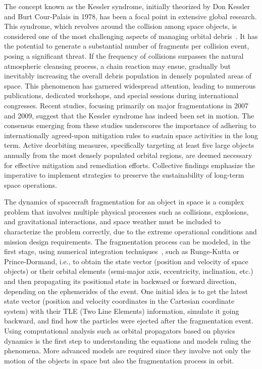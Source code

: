 \documentclass[11pt]{article} %
\begin{document}
The concept known as the Kessler syndrome, initially theorized by Don Kessler and Burt Cour-Palais in 1978, has been a focal point in extensive global research. This syndrome, which revolves around the collision among space objects, is considered one of the most challenging aspects of managing orbital debris~\cite{kessler_collision_1978}. It has the potential to generate a substantial number of fragments per collision event, posing a significant threat. If the frequency of collisions surpasses the natural atmospheric cleansing process, a chain reaction may ensue, gradually but inevitably increasing the overall debris population in densely populated areas of space. This phenomenon has garnered widespread attention, leading to numerous publications, dedicated workshops, and special sessions during international congresses. Recent studies, focusing primarily on major fragmentations in 2007 and 2009, suggest that the Kessler syndrome has indeed been set in motion. The consensus emerging from these studies underscores the importance of adhering to internationally agreed-upon mitigation rules to sustain space activities in the long term. Active deorbiting measures, specifically targeting at least five large objects annually from the most densely populated orbital regions, are deemed necessary for effective mitigation and remediation efforts. Collective findings emphasize the imperative to implement strategies to preserve the sustainability of long-term space operations.~\cite{bonnal_active_2013}

The dynamics of spacecraft fragmentation for an object in space is a complex problem that involves multiple physical processes such as collisions, explosions, and gravitational interactions, and space weather must be included to characterize the problem correctly, due to the extreme operational conditions and mission design requirements. The fragmentation process can be modeled, in the first stage, using numerical integration techniques~\cite{isoletta_orbital_2021}, such as Runge-Kutta or Prince-Dormand, i.e., to obtain the state vector (position and velocity of space objects) or their orbital elements (semi-major axis, eccentricity, inclination, etc.) and then propagating its positional state in backward or forward direction, depending on the ephemerides of the event. One initial idea is to get the latest state vector (position and velocity coordinates in the Cartesian coordinate system) with their TLE (Two Line Elements) information, simulate it going backward, and find how the particles were ejected after the fragmentation event. Using computational analysis such as orbital propagators based on physics dynamics is the first step to understanding the equations and models ruling the phenomena. More advanced models are required since they involve not only the motion of the objects in space but also the fragmentation process in orbit.
\end{document}
